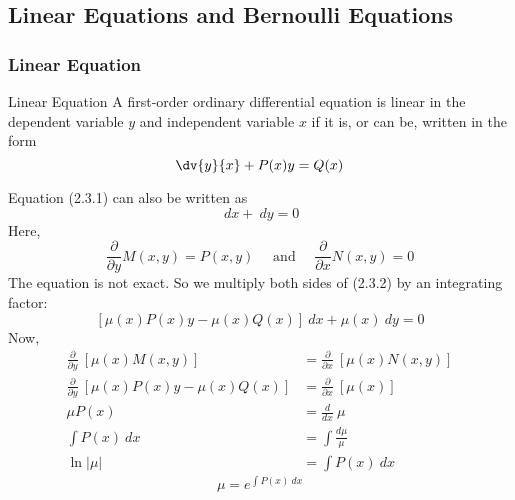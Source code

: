 
\subsection{Linear Equations and Bernoulli Equations}


\subsubsection{Linear Equation}
\begin{definition}{Linear Equation}{}
    A first-order ordinary differential equation is linear in the dependent variable $y$ and independent variable $x$ if it is, or can be, written in the form
    \begin{equation}
        \dv{y}{x} + P(x)y = Q(x)
    \end{equation}
\end{definition}
 Equation (2.3.1) can also be written as
    \begin{equation}
        [P(x)y - Q(x)] \: d{x} + \: d{y} = 0 
    \end{equation}
 Here, \[
     \frac{\partial}{\partial{y}} M(x,y) = P(x,y) \quad\text{ and }\quad \frac{\partial}{\partial{x}} N(x,y) = 0
 \]
 The equation is not exact. So we multiply both sides of (2.3.2) by an integrating factor: \[
     [\mu(x)P(x)y - \mu(x)Q(x)] \: d{x} + \mu(x) \: d{y} = 0
 \]
 Now,
\begin{align*}
    \frac{\partial}{\partial{y}} \: \left[\mu(x)M(x,y)\right] &= \frac{\partial}{\partial{x}} \: \left[\mu(x)N(x,y)\right] \\
    \frac{\partial}{\partial{y}} \: \left[\mu(x)P(x)y - \mu(x)Q(x)\right] &= \frac{\partial}{\partial{x}} \: \left[\mu(x)\right] \\
    \mu P(x) &= \frac{d}{dx} \: \mu \\
    \int{P(x)} \: d{x} &= \int{ \frac{d\mu}{\mu} } \\
    \ln|\mu| &= \int{P(x)} \: d{x}
\end{align*}
\[ \boxed{ \mu = e^{\int{ P(x) } \: d{x} } } \]

